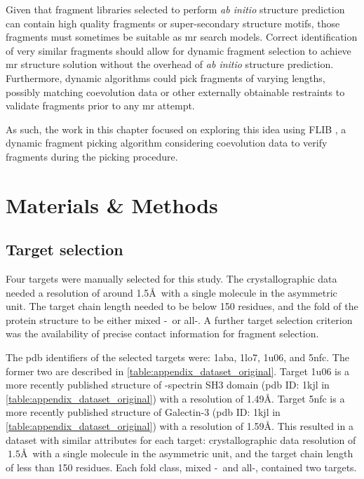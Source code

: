 Given that fragment libraries selected to perform \textit{ab initio} structure prediction can contain high quality fragments or super-secondary structure motifs, those fragments must sometimes be suitable as \gls{mr} search models. Correct identification of very similar fragments should allow for dynamic fragment selection to achieve \gls{mr} structure solution without the overhead of \textit{ab initio} structure prediction. Furthermore, dynamic algorithms could pick fragments of varying lengths, possibly matching coevolution data or other externally obtainable restraints to validate fragments prior to any \gls{mr} attempt. 

As such, the work in this chapter focused on exploring this idea using FLIB \cite{De_Oliveira2015-kb}, a dynamic fragment picking algorithm considering coevolution data to verify fragments during the picking procedure.

\section{Materials \& Methods}
\subsection{Target selection}
Four targets were manually selected for this study. The crystallographic data needed a resolution of around 1.5\AA\ with a single molecule in the asymmetric unit. The target chain length needed to be below 150 residues, and the fold of the protein structure to be either mixed \textalpha-\textbeta\ or all-\textbeta. A further target selection criterion was the availability of precise contact information for fragment selection.

The \gls{pdb} identifiers of the selected targets were: 1aba, 1lo7, 1u06, and 5nfc. The former two are described in \cref{table:appendix_dataset_original}. Target 1u06 is a more recently published structure of \textalpha-spectrin SH3 domain (\gls{pdb} ID: 1kjl in \cref{table:appendix_dataset_original}) with a resolution of 1.49\AA. Target 5nfc is a more recently published structure of Galectin-3 (\gls{pdb} ID: 1kjl in \cref{table:appendix_dataset_original}) with a resolution of 1.59\AA. This resulted in a dataset with similar attributes for each target: crystallographic data resolution of $~1.5$\AA\ with a single molecule in the asymmetric unit, and the target chain length of less than 150 residues. Each fold class, mixed \textalpha-\textbeta\ and all-\textbeta, contained two targets.

